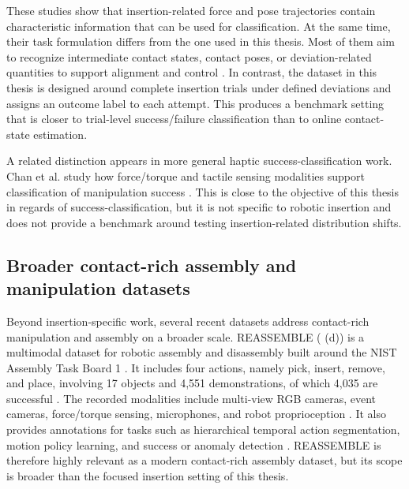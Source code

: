 These studies show that insertion-related force and pose trajectories contain characteristic information that can be used for classification. At the same time, their task formulation differs from the one used in this thesis. Most of them aim to recognize intermediate contact states, contact poses, or deviation-related quantities to support alignment and control \cite{jasimContactstateMonitoringForceguided2014,jinContactPoseIdentification2021a,abdullahForceTorqueData2015,yanLearningbasedContactStatus2021,shenLearningbasedRobotAssembly2025,xiongDeepLearningbasedHolefinding2026}. In contrast, the dataset in this thesis is designed around complete insertion trials under defined deviations and assigns an outcome label to each attempt. This produces a benchmark setting that is closer to trial-level success/failure classification than to online contact-state estimation.

A related distinction appears in more general haptic success-classification work. Chan et al. study how force/torque and tactile sensing modalities support classification of manipulation success \cite{chanEffectsForceTorqueTactile2019}. This is close to the objective of this thesis in regards of success-classification, but it is not specific to robotic insertion and does not provide a benchmark around testing insertion-related distribution shifts.

\subsection{Broader contact-rich assembly and manipulation datasets}

Beyond insertion-specific work, several recent datasets address contact-rich manipulation and assembly on a broader scale. REASSEMBLE ( (d)) is a multimodal dataset for robotic assembly and disassembly built around the NIST Assembly Task Board 1 \cite{sliwowskiREASSEMBLEMultimodalDataset2025,AssemblyPerformanceMetrics2018}. It includes four actions, namely pick, insert, remove, and place, involving 17 objects and 4,551 demonstrations, of which 4,035 are successful \cite{sliwowskiREASSEMBLEMultimodalDataset2025}. The recorded modalities include multi-view RGB cameras, event cameras, force/torque sensing, microphones, and robot proprioception \cite{sliwowskiREASSEMBLEMultimodalDataset2025}. It also provides annotations for tasks such as hierarchical temporal action segmentation, motion policy learning, and success or anomaly detection \cite{sliwowskiREASSEMBLEMultimodalDataset2025}. REASSEMBLE is therefore highly relevant as a modern contact-rich assembly dataset, but its scope is broader than the focused insertion setting of this thesis.

